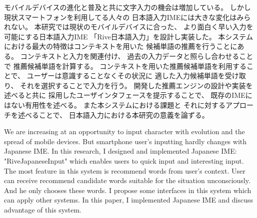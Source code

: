 


\begin{jabstract}

モバイルデバイスの進化と普及と共に文字入力の機会は増加している。
しかし現状スマートフォンを利用してる人々の
日本語入力IMEには大きな変化はみられない。
本研究では現状のモバイルデバイスに合った、
より面白く早い入力を可能にする日本語入力IME
「Rive日本語入力」を設計し実装した。
本システムにおける最大の特徴はコンテキストを用いた
候補単語の推薦を行うことにある。
コンテキストと入力を関連付け、
過去の入力データと照らし合わせることで
推薦候補単語を計算する。
コンテキストを用いた推薦候補単語を利用することで、
ユーザーは意識することなくその状況に
適した入力候補単語を受け取り、
それを選択することで入力を行う。
開発した推薦エンジンの設計や実装を述べると共に
採用したユーザインタフェースを提示することで、
既存のIMEにはない有用性を述べる。
また本システムにおける課題と
それに対するアプローチを述べることで、
日本語入力における本研究の意義を論ずる。

\end{jabstract}

\begin{eabstract}

We are increasing at an opportunity to input character
with evolution and the spread of mobile devices.
But smartphone user's inputting hardly changes with Japanese IME.
In this research, I designed and implemented Japanese IME:
"RiveJapaneseInput" which enables users
to quick input and interesting input.
The most feature in this system is recommend words from
user's context.
User can receive recommend candidate words suitable for
the situation unconsciously.
And he only chooses these words.
I propose some interfaces in this system which can apply
other systems.
In this paper, I implemented Japanese IME
and discuss advantage of this system.

\end{eabstract}
